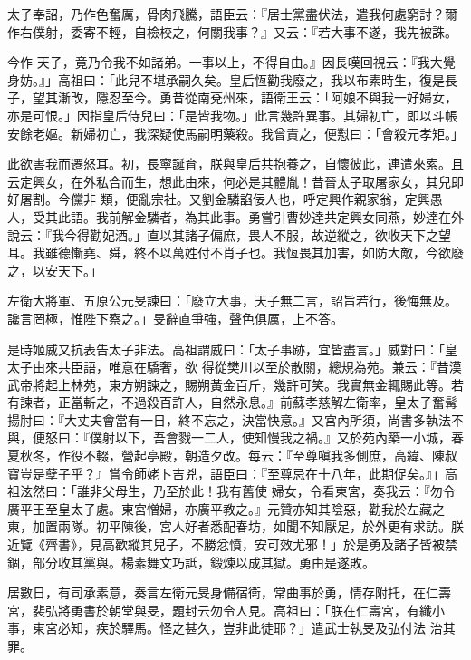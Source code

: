 \begin{pinyinscope}
 太子奉詔，乃作色奮厲，骨肉飛騰，語臣云：『居士黨盡伏法，遣我何處窮討？爾作右僕射，委寄不輕，自檢校之，何關我事？』又云：『若大事不遂，我先被誅。



 今作
 天子，竟乃令我不如諸弟。一事以上，不得自由。』因長嘆回視云：『我大覺身妨。』」高祖曰：「此兒不堪承嗣久矣。皇后恆勸我廢之，我以布素時生，復是長子，望其漸改，隱忍至今。勇昔從南兗州來，語衛王云：「阿娘不與我一好婦女，亦是可恨。」因指皇后侍兒曰：「是皆我物。」此言幾許異事。其婦初亡，即以斗帳安餘老嫗。新婦初亡，我深疑使馬嗣明藥殺。我曾責之，便懟曰：「會殺元孝矩。」



 此欲害我而遷怒耳。初，長寧誕育，朕與皇后共抱養之，自懷彼此，連遣來索。且云定興女，在外私合而生，想此由來，何必是其體胤！昔晉太子取屠家女，其兒即好屠割。今儻非
 類，便亂宗社。又劉金驎諂佞人也，呼定興作親家翁，定興愚人，受其此語。我前解金驎者，為其此事。勇嘗引曹妙達共定興女同燕，妙達在外說云：『我今得勸妃酒。」直以其諸子偏庶，畏人不服，故逆縱之，欲收天下之望耳。我雖德慚堯、舜，終不以萬姓付不肖子也。我恆畏其加害，如防大敵，今欲廢之，以安天下。」



 左衛大將軍、五原公元旻諫曰：「廢立大事，天子無二言，詔旨若行，後悔無及。讒言罔極，惟陛下察之。」旻辭直爭強，聲色俱厲，上不答。



 是時姬威又抗表告太子非法。高祖謂威曰：「太子事跡，宜皆盡言。」威對曰：「皇太子由來共臣語，唯意在驕奢，欲
 得從樊川以至於散關，總規為苑。兼云：『昔漢武帝將起上林苑，東方朔諫之，賜朔黃金百斤，幾許可笑。我實無金輒賜此等。若有諫者，正當斬之，不過殺百許人，自然永息。』前蘇孝慈解左衛率，皇太子奮髯揚肘曰：『大丈夫會當有一日，終不忘之，決當快意。』又宮內所須，尚書多執法不與，便怒曰：『僕射以下，吾會戮一二人，使知慢我之禍。』又於苑內築一小城，春夏秋冬，作役不輟，營起亭殿，朝造夕改。每云：『至尊嗔我多側庶，高緯、陳叔寶豈是孽子乎？』嘗令師姥卜吉兇，語臣曰：『至尊忌在十八年，此期促矣。』」高祖泫然曰：「誰非父母生，乃至於此！我有舊使
 婦女，令看東宮，奏我云：『勿令廣平王至皇太子處。東宮憎婦，亦廣平教之。』元贊亦知其陰惡，勸我於左藏之東，加置兩隊。初平陳後，宮人好者悉配春坊，如聞不知厭足，於外更有求訪。朕近覽《齊書》，見高歡縱其兒子，不勝忿憤，安可效尤邪！」於是勇及諸子皆被禁錮，部分收其黨與。楊素舞文巧詆，鍛煉以成其獄。勇由是遂敗。



 居數日，有司承素意，奏言左衛元旻身備宿衛，常曲事於勇，情存附托，在仁壽宮，裴弘將勇書於朝堂與旻，題封云勿令人見。高祖曰：「朕在仁壽宮，有纖小事，東宮必知，疾於驛馬。怪之甚久，豈非此徒耶？」遣武士執旻及弘付法
 治其罪。




\end{pinyinscope}
